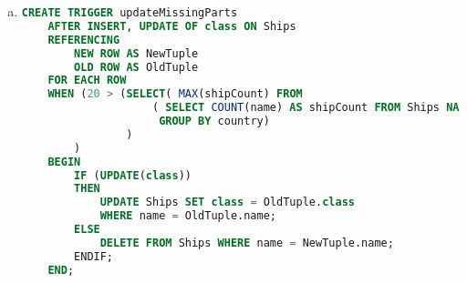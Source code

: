 \documentclass[12pt]{article}
\begin{document}
\begin{enumerate}[1.]
\begin{enumerate}[a)]
        \item

    \begin{lstlisting}[language=SQL]
    CREATE TRIGGER updateMissingParts
    AFTER INSERT, UPDATE OF class ON Ships
    REFERENCING
        NEW ROW AS NewTuple
        OLD ROW AS OldTuple
    FOR EACH ROW
    WHEN (20 > (SELECT( MAX(shipCount) FROM
                    ( SELECT COUNT(name) AS shipCount FROM Ships NATURAL JOIN Classes
                     GROUP BY country)
                )
        )
    BEGIN
        IF (UPDATE(class))
        THEN
            UPDATE Ships SET class = OldTuple.class
            WHERE name = OldTuple.name;
        ELSE
            DELETE FROM Ships WHERE name = NewTuple.name;
        ENDIF;
    END;
    \end{lstlisting}

    \end{enumerate}

\end{enumerate}
\end{document}
